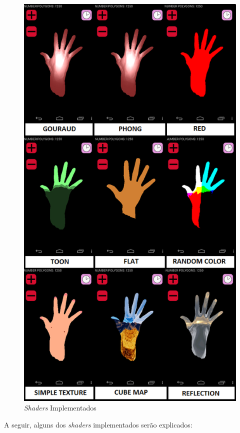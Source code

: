 	\begin{figure}[ht]
	\centering
		\includegraphics[keepaspectratio=true,scale=0.7]{figuras/shaders_impl.png}
	\caption{\textit{Shaders} Implementados}
	\label{shaders_impl}
	\end{figure}

	A seguir, alguns dos \textit{shaders} implementados serão explicados:

